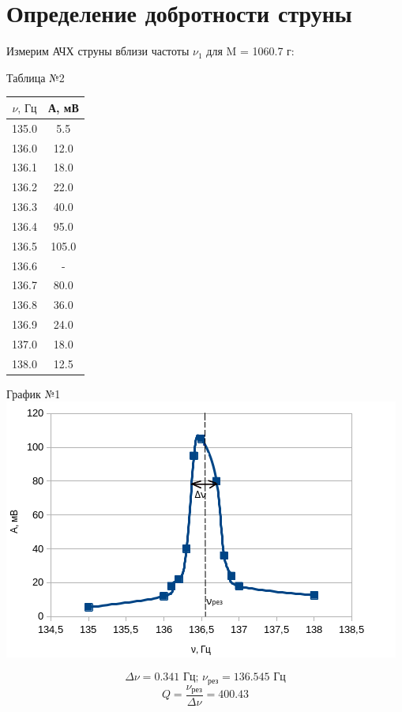 \documentclass[a4paper,12pt]{article} %
\begin{document}
\section{Определение добротности струны}
Измерим АЧХ струны вблизи частоты $\nu_1$ для M = 1060.7 г:
\begin{center}
Таблица №2\\
\begin{tabular}[h]{|c|c|}
\hline
$\nu\text{, Гц}$     & А, мВ    \\ \hline
135.0   & 5.5  \\ \hline
136.0   & 12.0   \\ \hline
136.1 & 18.0   \\ \hline
136.2 & 22.0   \\ \hline
136.3 & 40.0   \\ \hline
136.4 & 95.0   \\ \hline
136.5 & 105.0  \\ \hline
136.6 & -    \\ \hline
136.7 & 80.0   \\ \hline
136.8 & 36.0   \\ \hline
136.9 & 24.0   \\ \hline
137.0   & 18.0   \\ \hline
138.0   & 12.5 \\ \hline
\end{tabular}
\end{center}
\begin{center}
График №1\\
\includegraphics[scale=0.8]{graph}
\end{center}
\[\Delta\nu = 0.341 \text{ Гц; }\nu_{\text{рез}} = 136.545\text{ Гц}\]
\[Q = \frac{\nu_{\text{рез}}}{\Delta\nu} = 400.43\]
\end{document}
